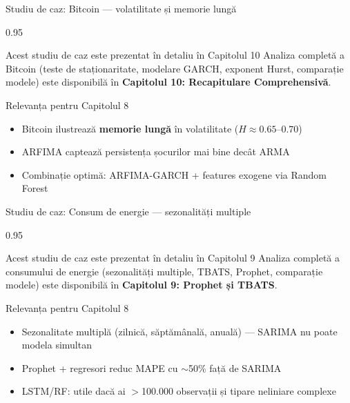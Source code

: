 \documentclass[9pt, aspectratio=169, t]{beamer}
\begin{document}
\begin{frame}{Studiu de caz: Bitcoin --- volatilitate și memorie lungă}
    \begin{cminipage}{0.95\textwidth}
        \begin{alertblock}{Acest studiu de caz este prezentat în detaliu în Capitolul 10}
            Analiza completă a Bitcoin (teste de staționaritate, modelare GARCH, exponent Hurst, comparație modele) este disponibilă în \textbf{Capitolul 10: Recapitulare Comprehensivă}.
        \end{alertblock}

        \vspace{0.2cm}

        \begin{block}{Relevanța pentru Capitolul 8}
            \begin{itemize}\setlength{\itemsep}{0pt}
                \item Bitcoin ilustrează \textbf{memorie lungă} în volatilitate ($H \approx 0.65$--$0.70$)
                \item ARFIMA captează persistența șocurilor mai bine decât ARMA
                \item Combinație optimă: ARFIMA-GARCH + features exogene via Random Forest
            \end{itemize}
        \end{block}
    \end{cminipage}
\end{frame}

\begin{frame}{Studiu de caz: Consum de energie --- sezonalități multiple}
    \begin{cminipage}{0.95\textwidth}
        \begin{alertblock}{Acest studiu de caz este prezentat în detaliu în Capitolul 9}
            Analiza completă a consumului de energie (sezonalități multiple, TBATS, Prophet, comparație modele) este disponibilă în \textbf{Capitolul 9: Prophet și TBATS}.
        \end{alertblock}

        \vspace{0.2cm}

        \begin{block}{Relevanța pentru Capitolul 8}
            \begin{itemize}\setlength{\itemsep}{0pt}
                \item Sezonalitate multiplă (zilnică, săptămânală, anuală) --- SARIMA nu poate modela simultan
                \item Prophet + regresori reduc MAPE cu $\sim$50\% față de SARIMA
                \item LSTM/RF: utile dacă ai $>$100.000 observații și tipare neliniare complexe
            \end{itemize}
        \end{block}
    \end{cminipage}
\end{frame}
\end{document}

